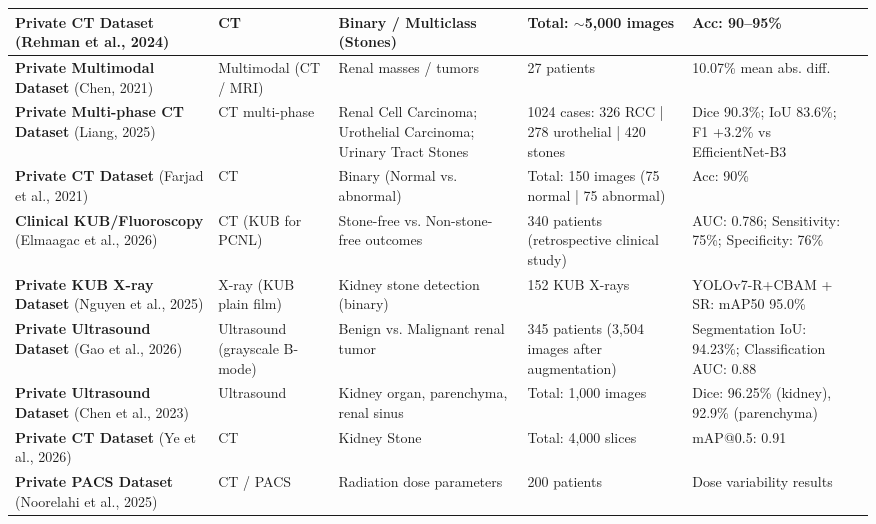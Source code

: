 \documentclass[pdflatex,sn-mathphys-num]{sn-jnl}%
\begin{document}
\begin{longtable}{|L{2.2cm}|L{1.3cm}|L{1.6cm}|L{2.2cm}|L{2.8cm}|L{1.7cm}|}
\textbf{Private CT Dataset} \newline (Rehman et al., 2024) & CT & Binary / Multiclass (Stones) & Total: $\sim$5,000 images & Acc: 90–95\% & \cite{rehman2024kidney} \\
\hline
\textbf{Private Multimodal Dataset} \newline (Chen, 2021) & Multimodal (CT / MRI) & Renal masses / tumors & 27 patients & 10.07\% mean abs. diff. & \cite{chen2021rapid} \\
\hline
\textbf{Private Multi-phase CT Dataset} \newline (Liang, 2025) & CT multi-phase & Renal Cell Carcinoma; Urothelial Carcinoma; Urinary Tract Stones & 1024 cases: 326 RCC | 278 urothelial | 420 stones & Dice 90.3\%; IoU 83.6\%; F1 +3.2\% vs EfficientNet-B3 & \cite{liang2025multicenter} \\
\hline
\textbf{Private CT Dataset} \newline (Farjad et al., 2021) & CT & Binary (Normal vs. abnormal) & Total: 150 images (75 normal | 75 abnormal) & Acc: 90\% & \cite{farjad2021ct} \\
\hline
\textbf{Clinical KUB/Fluoroscopy} \newline (Elmaagac et al., 2026) & CT (KUB for PCNL) & Stone-free vs. Non-stone-free outcomes & 340 patients (retrospective clinical study) & AUC: 0.786; Sensitivity: 75\%; Specificity: 76\% & \cite{elmaagac2026comparison} \\
\hline
\textbf{Private KUB X-ray Dataset} \newline (Nguyen et al., 2025) & X-ray (KUB plain film) & Kidney stone detection (binary) & 152 KUB X-rays & YOLOv7-R+CBAM + SR: mAP50 95.0\% & \cite{nguyen2025super} \\
\hline
\textbf{Private Ultrasound Dataset} \newline (Gao et al., 2026) & Ultrasound (grayscale B-mode) & Benign vs. Malignant renal tumor & 345 patients (3,504 images after augmentation) & Segmentation IoU: 94.23\%; Classification AUC: 0.88 & \cite{gao2026multitask} \\
\hline
\textbf{Private Ultrasound Dataset} \newline (Chen et al., 2023) & Ultrasound & Kidney organ, parenchyma, renal sinus & Total: 1,000 images & Dice: 96.25\% (kidney), 92.9\% (parenchyma) & \cite{chen2023glunet} \\
\hline
\textbf{Private CT Dataset} \newline (Ye et al., 2026) & CT & Kidney Stone & Total: 4,000 slices & mAP@0.5: 0.91 & \cite{ye2026automated} \\
\hline
\textbf{Private PACS Dataset} \newline (Noorelahi et al., 2025) & CT / PACS & Radiation dose parameters & 200 patients & Dose variability results & \cite{noorelahi2025pacs} \\
\hline


\end{longtable}
\end{document}
